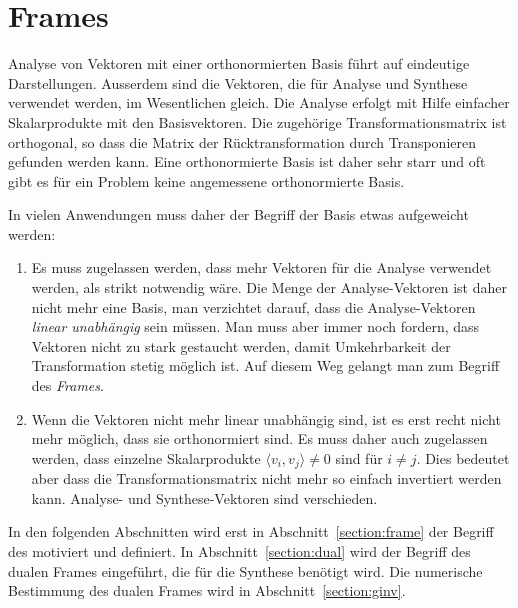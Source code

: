 %
%
%
\chapter{Frames
\label{chapter:frames}}

Analyse von Vektoren mit einer orthonormierten Basis führt auf eindeutige
Darstellungen. 
Ausserdem sind die Vektoren, die für Analyse und Synthese verwendet
werden, im Wesentlichen gleich.
Die Analyse erfolgt mit Hilfe einfacher Skalarprodukte mit den Basisvektoren.
Die zugehörige Transformationsmatrix ist orthogonal, so dass die
Matrix der Rücktransformation durch Transponieren gefunden werden kann.
Eine orthonormierte Basis ist daher sehr starr und oft gibt es für ein
Problem keine angemessene orthonormierte Basis.

In vielen Anwendungen muss daher der Begriff der Basis etwas aufgeweicht
werden:
\begin{enumerate}
\item
Es muss zugelassen werden, dass mehr Vektoren für die Analyse verwendet
werden, als strikt notwendig wäre.
Die Menge der Analyse-Vektoren ist daher nicht mehr eine Basis, man
verzichtet darauf, dass die Analyse-Vektoren {\em linear unabhängig} sein
müssen.
Man muss aber immer noch fordern, dass Vektoren nicht zu stark gestaucht
werden, damit Umkehrbarkeit der Transformation stetig möglich ist.
Auf diesem Weg gelangt man zum Begriff des {\em Frames}.
\item
Wenn die Vektoren nicht mehr linear unabhängig sind, ist es erst
recht nicht mehr möglich, dass sie orthonormiert sind.
Es muss daher auch zugelassen werden, dass einzelne Skalarprodukte 
$\langle v_i,v_j\rangle\ne 0$ sind für $i\ne j$.
Dies bedeutet aber dass die Transformationsmatrix nicht mehr so einfach
invertiert werden kann.
Analyse- und Synthese-Vektoren sind verschieden.
\end{enumerate}
In den folgenden Abschnitten wird erst in Abschnitt~\ref{section:frame}
der Begriff des motiviert und definiert.
In Abschnitt~\ref{section:dual} wird der Begriff des dualen Frames
eingeführt, die für die Synthese benötigt wird.
Die numerische Bestimmung des dualen Frames wird in
Abschnitt~\ref{section:ginv}.

